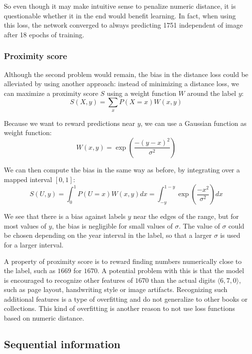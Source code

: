 So even though it may make intuitive sense to penalize numeric distance, it is questionable whether it in the end would benefit learning.
In fact, when using this loss, the network converged to always predicting 1751 independent of image after 18 epochs of training.


\subsubsection{Proximity score}

Although the second problem would remain, the bias in the distance loss could be alleviated by using another approach:
instead of minimizing a distance loss, we can maximize a proximity score $S$ using a weight function $W$ around the label $y$:
\[
S(X, y) = \sum_x P(X=x) W(x, y)
\]

Because we want to reward predictions near $y$, we can use a Gaussian function as weight function:
\[
W(x, y) = \exp \left( \frac{-(y-x)^2}{\sigma^2} \right)
\]

We can then compute the bias in the same way as before, by integrating over a mapped interval $[0,1]$:
\[
S(U, y) = \int_0^1 P(U=x) W(x, y) dx =
\int_{-y}^{1-y} \exp \left( \frac{-x^2}{\sigma^2} \right) dx
\]

We see that there is a bias against labels $y$ near the edges of the range, but for most values of $y$, the bias is negligible for small values of $\sigma$. The value of $\sigma$ could be chosen depending on the year interval in the label, so that a larger $\sigma$ is used for a larger interval.

A property of proximity score is to reward finding numbers numerically close to the label, such as $1669$ for $1670$. A potential problem with this is that the model is encouraged to recognize other features of $1670$ than the actual digits $\langle 6, 7, 0 \rangle$, such as page layout, handwriting style or image artifacts. Recognizing such additional features is a type of overfitting and do not generalize to other books or collections.
This kind of overfitting is another reason to not use loss functions based on numeric distance.

\newpage
\subsection{Sequential information}

